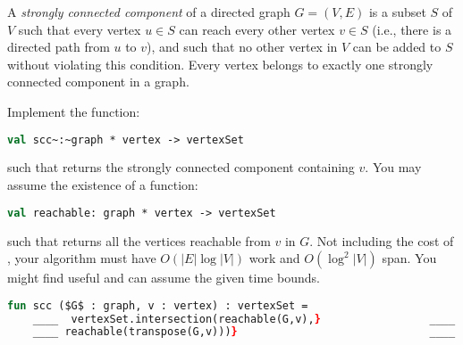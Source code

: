 \begin{problem}[10.]
A \emph{strongly connected component} of a directed graph $G = (V,E)$ is a subset $S$ of $V$ such
that every vertex $u \in S$ can reach every other vertex $v \in S$ (i.e.,
there is a directed path from $u$ to $v$), and such that no other vertex in
$V$ can be added to $S$ without violating this condition. Every vertex
belongs to exactly one strongly connected component{} in a graph.

\ask
Implement the function:
\begin{lstlisting}[language=Caml,numbers=none]
val scc~:~graph * vertex -> vertexSet
\end{lstlisting}
such that  returns the strongly connected component{} containing $v$. You may assume
the existence of a function:
\begin{lstlisting}[language=Caml,numbers=none]
val reachable: graph * vertex -> vertexSet
\end{lstlisting}
such that  returns all the vertices reachable from $v$
in $G$. Not including the cost of , your algorithm must
have $O(|E|\log|V|)$ work and $O(\log^2 |V|)$ span.  You might find
 useful and can assume the given time bounds.


\solfin
\begin{lstlisting}[language=Caml,numbers=none]
fun scc ($G$ : graph, v : vertex) : vertexSet = 
    ____  vertexSet.intersection(reachable(G,v),}                 ____
    ____ reachable(transpose(G,v)))}                              ____
\end{lstlisting}

\end{problem}

